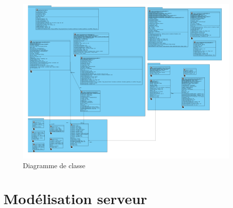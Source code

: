 \documentclass[titlepage, 12pt]{report}
\begin{document}
\begin{figure}[!h]
	\caption{Diagramme de classe}
	\label{class_diagram}
	\centering
	\includegraphics[scale=0.5]{Images/diagram/class_diagram.png}
\end{figure}


\chapter{Modélisation serveur}
\end{document}
